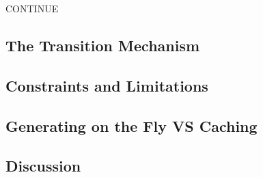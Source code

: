 CONTINUE

\subsection{The Transition Mechanism}

\subsection{Constraints and Limitations}

\subsection{Generating on the Fly VS Caching}

\subsection{Discussion}



